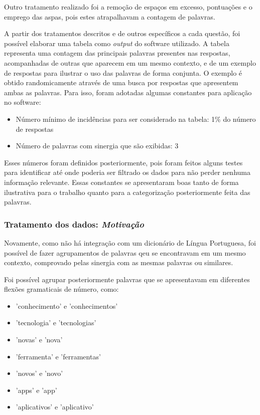 Outro tratamento realizado foi a remoção de espaços em excesso, pontuações e o emprego das aspas, pois estes atrapalhavam a contagem de palavras.

A partir dos tratamentos descritos e de outros específicos a cada questão, foi possível elaborar uma tabela como \textit{output} do software utilizado. A tabela representa uma contagem das principais palavras presentes nas respostas, acompanhadas de outras que aparecem em um mesmo contexto, e de um exemplo de respostas para ilustrar o uso das palavras de forma conjunta. O exemplo é obtido randomicamente através de uma busca por respostas que apresentem ambas as palavras. Para isso, foram adotadas algumas constantes para aplicação no software:

\begin{itemize}
\item Número mínimo de incidências para ser considerado na tabela: 1\% do número de respostas
\item Número de palavras com sinergia que são exibidas: 3
\end{itemize}

Esses números foram definidos posteriormente, pois foram feitos alguns testes para identificar até onde poderia ser filtrado os dados para não perder nenhuma informação relevante. Essas constantes se apresentaram boas tanto de forma ilustrativa para o trabalho quanto para a categorização posteriormente feita das palavras.

\subsubsection*{Tratamento dos dados: \textit{Motivação}}

Novamente, como não há integração com um dicionário de Língua Portuguesa, foi possível de fazer agrupamentos de palavras qeu se encontravam em um mesmo contexto, comprovado pelas sinergia com as mesmas palavras ou similares. 

Foi possível agrupar posteriormente palavras que se apresentavam em diferentes flexões gramaticais de número, como: 

\begin{itemize}
\item 'conhecimento' e 'conhecimentos'
\item 'tecnologia' e 'tecnologias' 
\item 'novas' e 'nova' 
\item 'ferramenta' e 'ferramentas' 
\item 'novos' e 'novo' 
\item 'apps' e 'app'
\item 'aplicativos' e 'aplicativo'
\end{itemize}

